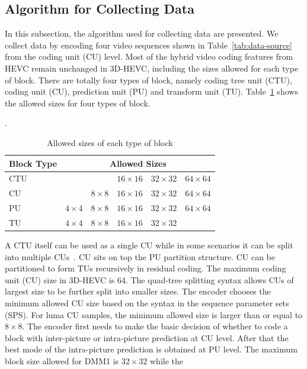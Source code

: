 \subsection{Algorithm for Collecting Data}\label{subsec:collecting-method}
In this subsection, the algorithm used for collecting data are presented.
We collect data by encoding four video sequences shown in
Table~\ref{tab:data-source} from the coding unit (CU) level.
Most of the hybrid video coding features from HEVC remain unchanged
in 3D-HEVC, including the sizes allowed for each type of block.
There are totally four types of block, namely coding tree unit (CTU),
coding unit (CU), prediction unit (PU) and transform unit (TU).
Table~\ref{tab:allowed-sizes-of-each-type-of-block} shows the allowed sizes
for four types of block.
\begin{table}[b]
    \caption{Allowed sizes of each type of block}
    \bigskip
    \label{tab:allowed-sizes-of-each-type-of-block}.
    \centering
    \begin{tabular}{l|c c c c c}
        \hline
        Block Type & \multicolumn{5}{c}{Allowed Sizes}\\
        \hline
        CTU & & & $16\times16$ & $32\times32$ & $64\times64$\\
        CU  & & $8\times8$ & $16\times16$ & $32\times32$ & $64\times64$\\
        PU  & $4\times4$ & $8\times8$ & $16\times16$ & $32\times32$ & $64\times64$\\
        TU  & $4\times4$ & $8\times8$ & $16\times16$ & $32\times32$ & \\
        \hline
    \end{tabular}
\end{table}
A CTU itself can be used as a single CU while in some scenarios it can
be split into multiple CUs~\parencite{RN46}.
CU sits on top the PU partition structure.
CU can be partitioned to form TUs recursively in residual coding.
The maximum coding unit (CU) size in 3D-HEVC is 64.
The quad-tree splitting syntax allows CUs of largest size to be further
split into smaller sizes.
The encoder chooses the minimum allowed CU size based on the syntax in
the sequence parameter sets (SPS).
For luma CU samples, the minimum allowed size is larger than or equal to
$8\times8$.
The encoder first needs to make the basic decision of whether to code a
block with inter-picture or intra-picture prediction at CU level.
After that the best mode of the intra-picture prediction is
obtained at PU level.
The maximum block size allowed for DMM1 is $32\times32$ while the
